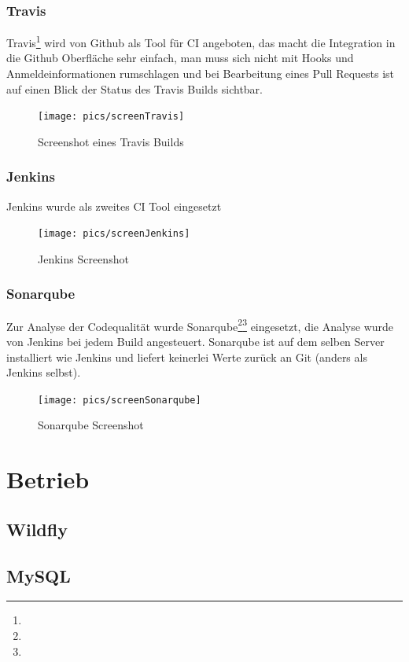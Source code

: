 \documentclass[12pt,a4paper,parskip]{scrreprt}
\begin{document}
\subsubsection{Travis}
Travis\footnote{} wird von Github als Tool für CI angeboten, das macht die Integration in die Github Oberfläche sehr einfach, man muss sich nicht mit Hooks und Anmeldeinformationen rumschlagen und bei Bearbeitung eines Pull Requests ist auf einen Blick der Status des Travis Builds sichtbar.
\begin{figure}[!hbtp]%
\centering
\texttt{[image: pics/screenTravis]}
\caption[Travis]{Screenshot eines Travis Builds}
\label{fig:screenTravis}
\end{figure}
\subsubsection{Jenkins}
Jenkins wurde als zweites CI Tool eingesetzt
\begin{figure}[!hbtp]%
\centering
\texttt{[image: pics/screenJenkins]}
\caption[Jenkins]{Jenkins Screenshot}
\label{fig:screenJenkins}
\end{figure}
\subsubsection{Sonarqube}
Zur Analyse der Codequalität wurde Sonarqube\footnote{}\footnote{} eingesetzt, die Analyse wurde von Jenkins bei jedem Build angesteuert. Sonarqube ist auf dem selben Server installiert wie Jenkins und liefert keinerlei Werte zurück an Git (anders als Jenkins selbst).
\begin{figure}[!hbtp]%
\centering
\texttt{[image: pics/screenSonarqube]}
\caption[Sonarqube]{Sonarqube Screenshot}
\label{fig:screenSonarqube}
\end{figure}
\section{Betrieb}
\subsection{Wildfly}
\subsection{MySQL}
\end{document}

